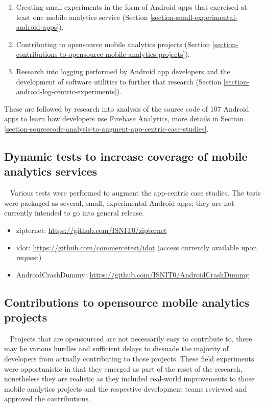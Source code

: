 \begin{enumerate}
    \itemsep0em
    \item Creating small experiments in the form of Android apps that exercised at least one mobile analytics service (Section \ref{section-small-experimental-android-apps}).
    \item Contributing to opensource mobile analytics projects (Section \ref{section-contributions-to-opensource-mobile-analytics-projects}).
    \item Research into logging performed by Android app developers and the development of software utilities to further that research (Section \ref{section-android-log-centric-experiments}). 
\end{enumerate}

These are followed by research into analysis of the source code of 107 Android apps to learn how developers use Firebase Analytics, more details in Section \ref{section-sourcecode-analysis-to-augment-app-centric-case-studies}.

\subsection{Dynamic tests to increase coverage of mobile analytics services}~\label{section-small-experimental-android-apps}
Various tests were performed to augment the app-centric case studies. The tests were packaged as several, small, experimental Android apps; they are not currently intended to go into general release.

\begin{itemize}
    \itemsep0em
    \item zipternet: \url{https://github.com/ISNIT0/zipternet}
    \item idot: \url{https://github.com/commercetest/idot} (access currently available upon request)
    \item AndroidCrashDummy: \url{https://github.com/ISNIT0/AndroidCrashDummy}
\end{itemize}

\subsection{Contributions to opensource mobile analytics projects}~\label{section-contributions-to-opensource-mobile-analytics-projects}
Projects that are opensourced are not necessarily easy to contribute to, there may be various hurdles and sufficient delays to dissuade the majority of developers from actually contributing to those projects. These field experiments were opportunistic in that they emerged as part of the reset of the research, nonetheless they are realistic as they included real-world improvements to those mobile analytics projects and the respective development teams reviewed and approved the contributions.

